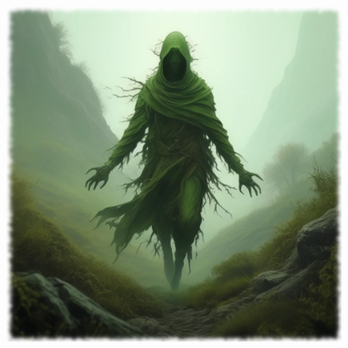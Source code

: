 

\begin{figure}[h]
\begin{center}
\includegraphics[scale=0.24]{img/ai-images/disease-spirit.png}
\end{center}
\end{figure}
